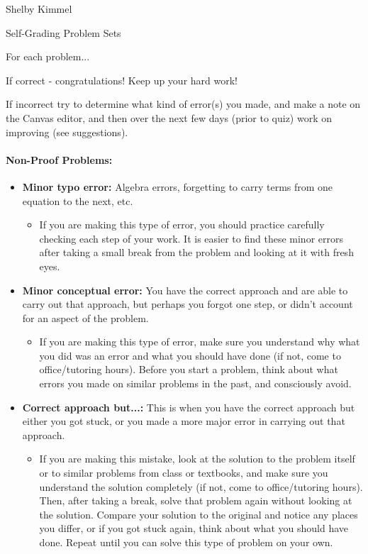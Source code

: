 \documentclass[12pt]{article}
\theoremstyle{definition}
\begin{document}
\hfill Shelby Kimmel

\begin{center}
{\huge Self-Grading Problem Sets}
\end{center}
For each problem...

If correct - congratulations! Keep up your hard work!

If incorrect try to determine what kind of error(s) you made, and make a note on the Canvas editor, and then over the next few days (prior to quiz) work on improving (see suggestions).

\paragraph{{\Large{Non-Proof Problems:}}}

\begin{itemize}
\item \textbf{Minor typo error:} Algebra errors, forgetting to carry terms from one equation to the next, etc. 
\begin{itemize}
\item If you are making this type of error, you should practice carefully checking each step of your work. It is easier to find these minor errors after taking a small break from the problem and looking at it with fresh eyes.
\end{itemize}
\item \textbf{Minor conceptual error:} You have the correct approach and are able to carry out that approach, but perhaps you forgot one step, or didn't account for an aspect of the problem. 
\begin{itemize}
\item If you are making this type of error, make sure you understand why what you did was an error and what you should have done (if not, come to office/tutoring hours). Before you start a problem, think about what errors you made on similar problems in the past, and consciously avoid.
\end{itemize}
\item \textbf{Correct approach but...:} This is when you have the correct approach but either you got stuck, or you made a more major error in carrying out that approach. 
\begin{itemize}
\item If you are making this mistake, look at the solution to the problem itself or to similar problems from class or textbooks, and make sure you understand the solution completely (if not, come to office/tutoring hours). Then, after taking a break, solve that problem again without looking at the solution. Compare your solution to the original and notice any places you differ, or if you got stuck again, think about what you should have done. Repeat until you can solve this type of problem on your own.

\end{itemize}
\end{itemize}
\end{document}
